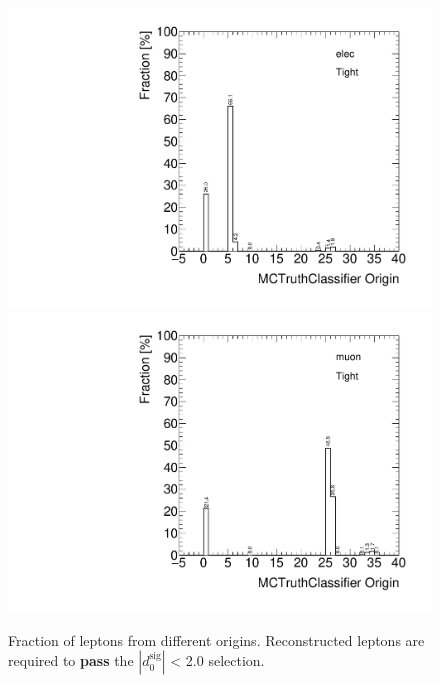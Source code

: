 \begin{figure}[!htbp]
\begin{center}
\includegraphics[scale=0.33]{./figures/boosted/FakeLeptons/JZXW_Origin_elec_Tight}
\includegraphics[scale=0.33]{./figures/boosted/FakeLeptons/JZXW_Origin_muon_Tight}
\caption{Fraction of leptons from different origins. Reconstructed leptons are required to \textbf{pass} the $|d_{0}^{\textrm{sig}}|$ < 2.0 selection.}
\label{fig:boosted_fakeorigin_passcut}
\end{center}
\end{figure}
